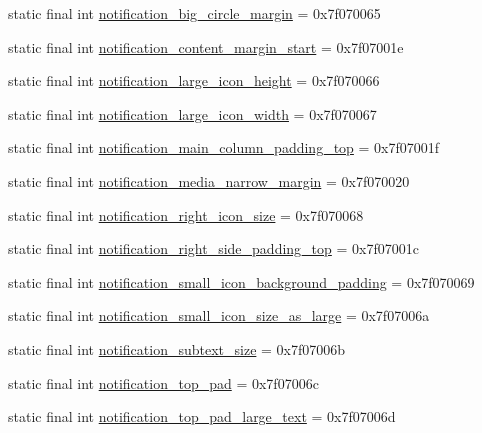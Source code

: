 \begin{CompactItemize}
\item 
static final int \hyperlink{classandroid_1_1support_1_1v4_1_1_r_1_1dimen_b39f63dd544a4c501ac4be187e876c5d}{notification\_\-big\_\-circle\_\-margin} = 0x7f070065
\item 
static final int \hyperlink{classandroid_1_1support_1_1v4_1_1_r_1_1dimen_d5acabd77cb36a1853e489e703f547f9}{notification\_\-content\_\-margin\_\-start} = 0x7f07001e
\item 
static final int \hyperlink{classandroid_1_1support_1_1v4_1_1_r_1_1dimen_2f603d27bb165f5e340f6d5b8f886d42}{notification\_\-large\_\-icon\_\-height} = 0x7f070066
\item 
static final int \hyperlink{classandroid_1_1support_1_1v4_1_1_r_1_1dimen_a18ab0353d7d0e4d3a1107c0bd02898b}{notification\_\-large\_\-icon\_\-width} = 0x7f070067
\item 
static final int \hyperlink{classandroid_1_1support_1_1v4_1_1_r_1_1dimen_39ab10444585fdb8efdd69f5754e9610}{notification\_\-main\_\-column\_\-padding\_\-top} = 0x7f07001f
\item 
static final int \hyperlink{classandroid_1_1support_1_1v4_1_1_r_1_1dimen_451f956c1f0e38a4c21cfc9b64374e84}{notification\_\-media\_\-narrow\_\-margin} = 0x7f070020
\item 
static final int \hyperlink{classandroid_1_1support_1_1v4_1_1_r_1_1dimen_7528b9a42cd96c324bc6fe426beba799}{notification\_\-right\_\-icon\_\-size} = 0x7f070068
\item 
static final int \hyperlink{classandroid_1_1support_1_1v4_1_1_r_1_1dimen_8991df3a4ee6725fc6ba2bb60018c244}{notification\_\-right\_\-side\_\-padding\_\-top} = 0x7f07001c
\item 
static final int \hyperlink{classandroid_1_1support_1_1v4_1_1_r_1_1dimen_04ed5e0dd22a4a8cf47a819711977544}{notification\_\-small\_\-icon\_\-background\_\-padding} = 0x7f070069
\item 
static final int \hyperlink{classandroid_1_1support_1_1v4_1_1_r_1_1dimen_758d30b9ab955f3730c31e501edc4388}{notification\_\-small\_\-icon\_\-size\_\-as\_\-large} = 0x7f07006a
\item 
static final int \hyperlink{classandroid_1_1support_1_1v4_1_1_r_1_1dimen_c16b69c538e879b758696c18ee137c8d}{notification\_\-subtext\_\-size} = 0x7f07006b
\item 
static final int \hyperlink{classandroid_1_1support_1_1v4_1_1_r_1_1dimen_7eba7e8b85f7290a998627f80739e5b3}{notification\_\-top\_\-pad} = 0x7f07006c
\item 
static final int \hyperlink{classandroid_1_1support_1_1v4_1_1_r_1_1dimen_dcad2c07a68d12c9ea5b3940d8de1053}{notification\_\-top\_\-pad\_\-large\_\-text} = 0x7f07006d
\end{CompactItemize}


